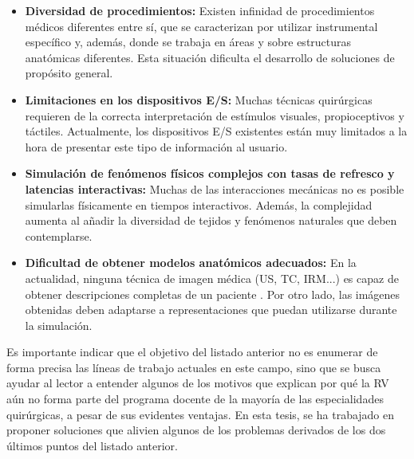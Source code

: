 \begin{itemize}
    \item \textbf{Diversidad de procedimientos:} Existen infinidad de procedimientos médicos diferentes entre sí, que se caracterizan por utilizar instrumental específico y, además, donde se trabaja en áreas y sobre estructuras anatómicas diferentes. Esta situación dificulta el desarrollo de soluciones de propósito general.
    \item \textbf{Limitaciones en los dispositivos \ac{E/S}:} Muchas técnicas quirúrgicas requieren de la correcta interpretación de estímulos visuales,  propioceptivos y táctiles. Actualmente, los dispositivos E/S existentes están muy limitados a la hora de presentar este tipo de información al usuario. 
    \item \textbf{Simulación de fenómenos físicos complejos con tasas de refresco y latencias interactivas:} Muchas de las interacciones mecánicas no es posible simularlas físicamente en tiempos interactivos. Además, la complejidad aumenta al añadir la diversidad de tejidos y fenómenos naturales que deben contemplarse. 
    \item \textbf{Dificultad de obtener modelos anatómicos adecuados:} En la actualidad, ninguna técnica de imagen médica (\ac{US}, \ac{TC}, \ac{IRM}...) es capaz de obtener descripciones completas de un paciente \cite{ferrante2017slice}. Por otro lado, las imágenes obtenidas deben adaptarse a representaciones que puedan utilizarse durante la simulación.
\end{itemize}

Es importante indicar que el objetivo del listado anterior no es enumerar de forma precisa las líneas de trabajo actuales en este campo, sino que se busca ayudar al lector a entender algunos de los motivos que explican por qué la \ac{RV} aún no forma parte del programa docente de la mayoría de las especialidades quirúrgicas, a pesar de sus evidentes ventajas. En esta tesis, se ha trabajado en proponer soluciones que alivien algunos de los problemas derivados de los dos últimos puntos del listado anterior.



